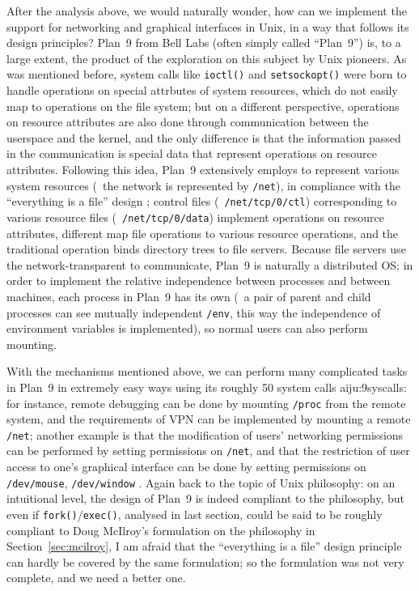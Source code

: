 After the analysis above, we would naturally wonder, how can we implement the
support for networking and graphical interfaces in Unix, in a way that follows
its design principles?  Plan~9 from Bell Labs (often simply called ``Plan~9'')
is, to a large extent, the product of the exploration on this subject by Unix
pioneers.  As was mentioned before, system calls like
\verb|ioctl()| and \verb|setsockopt()| were born to handle operations on
special attrbutes of system resources, which do not easily map to operations
on the file system; but on a different perspective, operations on resource
attributes are also done through communication between the userspace and the
kernel, and the only difference is that the information passed in the
communication is special data that represent operations on resource attributes.
Following this idea, Plan~9 extensively employs 
to represent various system resources (\eg~the network is represented by
\verb|/net|), in compliance with the ``everything is a file'' design%
; control files (\eg~\verb|/net/tcp/0/ctl|) corresponding
to various resource files (\eg~\verb|/net/tcp/0/data|) implement operations
on resource attributes, different  map file operations
to various resource operations, and the traditional 
operation binds directory trees to file servers.  Because file servers use
the network-transparent  to communicate, Plan~9 is
naturally a distributed OS; in order to implement the relative independence
between processes and between machines, each process in Plan~9 has its own
 (\eg~a pair of parent and child processes can see mutually
independent \verb|/env|, this way the independence of environment variables
is implemented), so normal users can also perform mounting.

With the mechanisms mentioned above, we can perform many complicated tasks in
Plan~9 in extremely easy ways using its roughly 50 system calls\cupercite%
{aiju:9syscalls}: for instance, remote debugging can be done by mounting
\verb|/proc| from the remote system, and the requirements of VPN can be
implemented by mounting a remote \verb|/net|; another example is that the
modification of users' networking permissions can be performed by setting
permissions on \verb|/net|, and that the restriction of user access to one's
graphical interface can be done by setting permissions on \verb|/dev/mouse|,
\verb|/dev/window| \etc.  Again back to the topic of Unix philosophy: on an
intuitional level, the design of Plan~9 is indeed compliant to the philosophy,
but even if \verb|fork()|/\verb|exec()|, analysed in last section, could be
said to be roughly compliant to Doug McIlroy's formulation on the philosophy
in Section~\ref{sec:mcilroy}, I am afraid that the ``everything is a file''
design principle can hardly be covered by the same formulation; so
the formulation was not very complete, and we need a better one.

